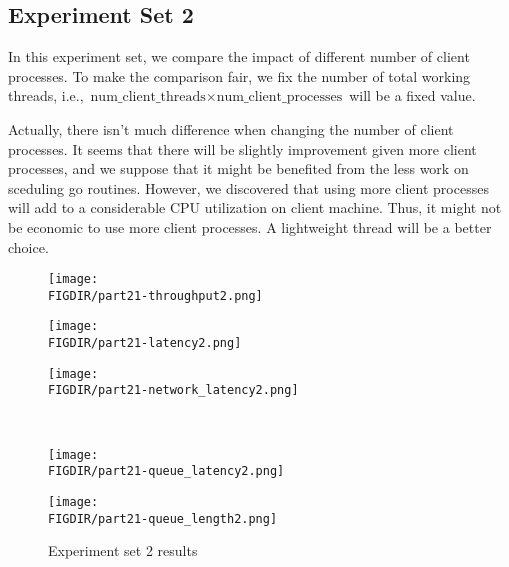 \documentclass{article}
\begin{document}
\begin{spacing}{1.1}
\subsection{Experiment Set 2}
In this experiment set, we compare the impact of different number of client processes. To make the comparison fair, we fix the number of total working threads, i.e., $\text{num\_client\_threads} \times \text{num\_client\_processes}$ will be a fixed value.

Actually, there isn't much difference when changing the number of client processes. It seems that there will be slightly improvement given more client processes, and we suppose that it might be benefited from the less work on sceduling go routines. However, we discovered that using more client processes will add to a considerable CPU utilization on client machine. Thus, it might not be economic to use more client processes. A lightweight thread will be a better choice.

\begin{figure}[htbp]
    \centering
	\begin{minipage}{0.32\linewidth}
		\centering
		\texttt{[image: \\FIGDIR/part21-throughput2.png]}
		\label{throuput2}
	\end{minipage}
	\begin{minipage}{0.32\linewidth}
		\centering
		\texttt{[image: \\FIGDIR/part21-latency2.png]}
		\label{latency2}
	\end{minipage}
    \begin{minipage}{0.32\linewidth}
		\centering
		\texttt{[image: \\FIGDIR/part21-network\_latency2.png]}
		\label{network-latency2}
	\end{minipage} \\
    \begin{minipage}{0.32\linewidth}
		\centering
		\texttt{[image: \\FIGDIR/part21-queue\_latency2.png]}
		\label{queue-latency2}
	\end{minipage}
	\begin{minipage}{0.32\linewidth}
		\centering
		\texttt{[image: \\FIGDIR/part21-queue\_length2.png]}
		\label{queue-length2}
	\end{minipage}
    \caption{Experiment set 2 results}
\end{figure}





\end{spacing}
\end{document}
